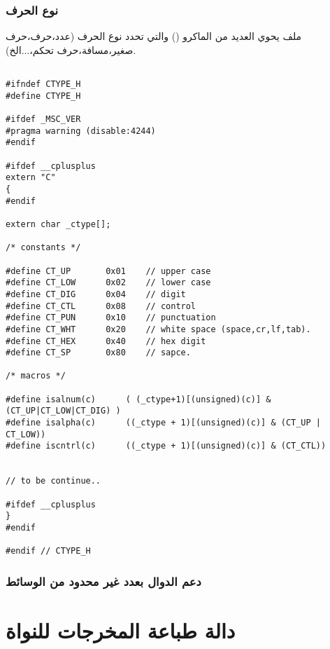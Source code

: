 \documentclass[document.tex]{subfiles}
\begin{document}
\subsubsection{نوع الحرف}
ملف  يحوي العديد من الماكرو () والتي تحدد نوع الحرف (عدد،حرف،حرف صغير،مسافة،حرف تحكم،...الخ).

\begin{english}

\lstset{numberstyle=\tiny,numbers=left,stepnumber=1,numbersep=5pt,tabsize=2,extendedchars=true,breaklines=true,frame=b,showspaces=false, showtabs=false,xleftmargin=10pt,framexleftmargin=10pt,framexrightmargin=5pt,framexbottommargin=4pt,showstringspaces=false,language=C++}

\begin{lstlisting}[label=char_type,caption=\en{ctype.h:determine character type}]

#ifndef CTYPE_H
#define CTYPE_H

#ifdef _MSC_VER
#pragma warning (disable:4244)
#endif

#ifdef __cplusplus
extern "C"
{
#endif

extern char _ctype[];

/* constants */

#define	CT_UP 		0x01	// upper case
#define CT_LOW		0x02	// lower case
#define CT_DIG		0x04	// digit
#define CT_CTL		0x08	// control
#define CT_PUN		0x10	// punctuation
#define CT_WHT		0x20	// white space (space,cr,lf,tab).
#define CT_HEX		0x40	// hex digit
#define CT_SP		0x80	// sapce.

/* macros */

#define isalnum(c)		( (_ctype+1)[(unsigned)(c)] & (CT_UP|CT_LOW|CT_DIG) )
#define isalpha(c)		((_ctype + 1)[(unsigned)(c)] & (CT_UP | CT_LOW))
#define iscntrl(c)	    ((_ctype + 1)[(unsigned)(c)] & (CT_CTL))


// to be continue..

#ifdef __cplusplus
}
#endif

#endif // CTYPE_H

\end{lstlisting}
\end{english}

\subsubsection{دعم الدوال بعدد غير محدود من الوسائط}

\section{دالة طباعة المخرجات للنواة}
\end{document}
